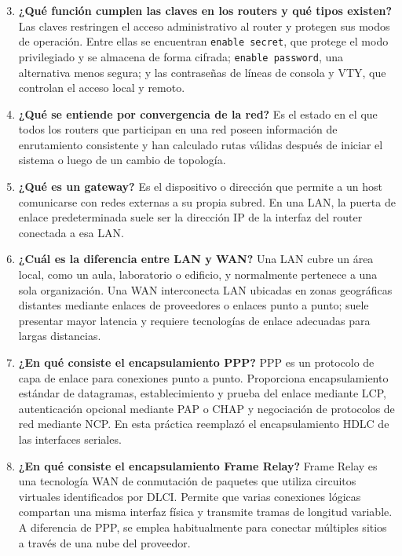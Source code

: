 \documentclass[a4paper,12pt]{article}
\begin{document}
\begin{enumerate}[label=6.\arabic*.]
    \setcounter{enumi}{2}
    \item \textbf{¿Qué función cumplen las claves en los routers y qué tipos existen?} Las claves restringen el acceso administrativo al router y protegen sus modos de operación. Entre ellas se encuentran \texttt{enable secret}, que protege el modo privilegiado y se almacena de forma cifrada; \texttt{enable password}, una alternativa menos segura; y las contraseñas de líneas de consola y VTY, que controlan el acceso local y remoto.
    \item \textbf{¿Qué se entiende por convergencia de la red?} Es el estado en el que todos los routers que participan en una red poseen información de enrutamiento consistente y han calculado rutas válidas después de iniciar el sistema o luego de un cambio de topología.
    \item \textbf{¿Qué es un gateway?} Es el dispositivo o dirección que permite a un host comunicarse con redes externas a su propia subred. En una LAN, la puerta de enlace predeterminada suele ser la dirección IP de la interfaz del router conectada a esa LAN.
    \item \textbf{¿Cuál es la diferencia entre LAN y WAN?} Una LAN cubre un área local, como un aula, laboratorio o edificio, y normalmente pertenece a una sola organización. Una WAN interconecta LAN ubicadas en zonas geográficas distantes mediante enlaces de proveedores o enlaces punto a punto; suele presentar mayor latencia y requiere tecnologías de enlace adecuadas para largas distancias.
    \item \textbf{¿En qué consiste el encapsulamiento PPP?} PPP es un protocolo de capa de enlace para conexiones punto a punto. Proporciona encapsulamiento estándar de datagramas, establecimiento y prueba del enlace mediante LCP, autenticación opcional mediante PAP o CHAP y negociación de protocolos de red mediante NCP. En esta práctica reemplazó el encapsulamiento HDLC de las interfaces seriales.
    \item \textbf{¿En qué consiste el encapsulamiento Frame Relay?} Frame Relay es una tecnología WAN de conmutación de paquetes que utiliza circuitos virtuales identificados por DLCI. Permite que varias conexiones lógicas compartan una misma interfaz física y transmite tramas de longitud variable. A diferencia de PPP, se emplea habitualmente para conectar múltiples sitios a través de una nube del proveedor.
\end{enumerate}
\end{document}
